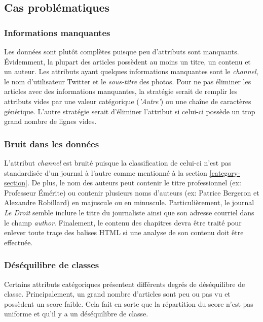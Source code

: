 \documentclass[french]{article}
\begin{document}
\subsection{Cas problématiques}

\subsubsection{Informations manquantes}
Les données sont plutôt complètes puisque peu d'attributs sont manquants. Évidemment, la plupart des articles possèdent au moins un titre, un contenu et un auteur. Les attributs ayant quelques informations manquantes sont le \emph{channel}, le nom d'utilisateur Twitter et le \emph{sous-titre} des photos. Pour ne pas éliminer les articles avec des informations manquantes, la stratégie serait de remplir les attributs vides par une valeur catégorique (\emph{'Autre'}) ou une chaîne de caractères générique. L'autre stratégie serait d'éliminer l'attribut si celui-ci possède un trop grand nombre de lignes vides.

\subsubsection{Bruit dans les données}
L'attribut \emph{channel} est bruité puisque la classification de celui-ci n'est pas standardisée d'un journal à l'autre comme mentionné à la section \ref{category-section}. De plus, le nom des auteurs peut contenir le titre professionnel (ex: Professeur Émérite) ou contenir plusieurs noms d'auteurs (ex: Patrice Bergeron et Alexandre Robillard) en majuscule ou en minuscule. Particulièrement, le journal \emph{Le Droit} semble inclure le titre du journaliste ainsi que son adresse courriel dans le champ \emph{author}. Finalement, le contenu des chapitres devra être traité pour enlever toute traçe des balises HTML si une analyse de son contenu doit être effectuée.

\subsubsection{Déséquilibre de classes}
Certains attributs catégoriques présentent différents degrés de déséquilibre de classe. Principalement, un grand nombre d'articles sont peu ou pas vu et possèdent un score faible. Cela fait en sorte que la répartition du score n'est pas uniforme et qu'il y a un déséquilibre de classe.

\end{document}

